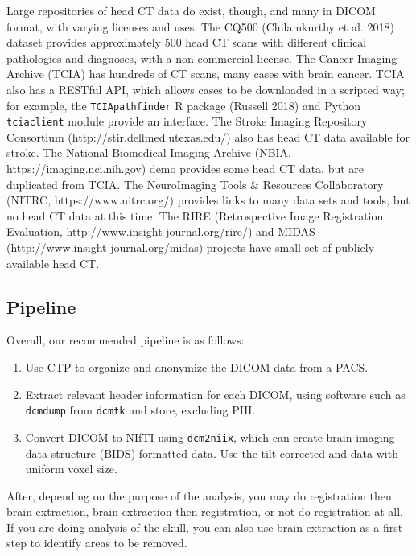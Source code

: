 \documentclass[]{elsarticle} %
\providecommand{\tightlist}{%
  \setlength{\itemsep}{0pt}\setlength{\parskip}{0pt}}
\begin{document}
Large repositories of head CT data do exist, though, and many in DICOM
format, with varying licenses and uses. The CQ500 (Chilamkurthy et al.
2018) dataset provides approximately 500 head CT scans with different
clinical pathologies and diagnoses, with a non-commercial license. The
Cancer Imaging Archive (TCIA) has hundreds of CT scans, many cases with
brain cancer. TCIA also has a RESTful API, which allows cases to be
downloaded in a scripted way; for example, the \texttt{TCIApathfinder} R
package (Russell 2018) and Python \texttt{tciaclient} module provide an
interface. The Stroke Imaging Repository Consortium
(http://stir.dellmed.utexas.edu/) also has head CT data available for
stroke. The National Biomedical Imaging Archive (NBIA,
https://imaging.nci.nih.gov) demo provides some head CT data, but are
duplicated from TCIA. The NeuroImaging Tools \& Resources Collaboratory
(NITRC, https://www.nitrc.org/) provides links to many data sets and
tools, but no head CT data at this time. The RIRE (Retrospective Image
Registration Evaluation, http://www.insight-journal.org/rire/) and MIDAS
(http://www.insight-journal.org/midas) projects have small set of
publicly available head CT.

\hypertarget{pipeline}{%
\subsection{Pipeline}\label{pipeline}}

Overall, our recommended pipeline is as follows:

\begin{enumerate}
\def\labelenumi{\arabic{enumi}.}
\tightlist
\item
  Use CTP to organize and anonymize the DICOM data from a PACS.
\item
  Extract relevant header information for each DICOM, using software
  such as \texttt{dcmdump} from \texttt{dcmtk} and store, excluding PHI.
\item
  Convert DICOM to NIfTI using \texttt{dcm2niix}, which can create brain
  imaging data structure (BIDS) formatted data. Use the tilt-corrected
  and data with uniform voxel size.
\end{enumerate}

After, depending on the purpose of the analysis, you may do registration
then brain extraction, brain extraction then registration, or not do
registration at all. If you are doing analysis of the skull, you can
also use brain extraction as a first step to identify areas to be
removed.
\end{document}
